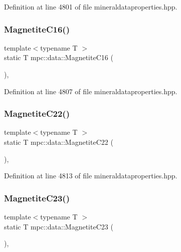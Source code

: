 Definition at line 4801 of file mineraldataproperties.\+hpp.

\mbox{\label{namespacempc_1_1data_aaad0bdfaea022f679ab0cd3856920bb4}} 
\subsubsection{\texorpdfstring{Magnetite\+C16()}{MagnetiteC16()}}
{\footnotesize\ttfamily template$<$typename T $>$ \\
static T mpc\+::data\+::\+Magnetite\+C16 (\begin{DoxyParamCaption}{ }\end{DoxyParamCaption})\hspace{0.3cm}{\ttfamily [inline]}, {\ttfamily [static]}}



Definition at line 4807 of file mineraldataproperties.\+hpp.

\mbox{\label{namespacempc_1_1data_a1c6a2798f409cbc3e05328944425c280}} 
\subsubsection{\texorpdfstring{Magnetite\+C22()}{MagnetiteC22()}}
{\footnotesize\ttfamily template$<$typename T $>$ \\
static T mpc\+::data\+::\+Magnetite\+C22 (\begin{DoxyParamCaption}{ }\end{DoxyParamCaption})\hspace{0.3cm}{\ttfamily [inline]}, {\ttfamily [static]}}



Definition at line 4813 of file mineraldataproperties.\+hpp.

\mbox{\label{namespacempc_1_1data_abd1234216ade8e4dd5469f010ec31bdb}} 
\subsubsection{\texorpdfstring{Magnetite\+C23()}{MagnetiteC23()}}
{\footnotesize\ttfamily template$<$typename T $>$ \\
static T mpc\+::data\+::\+Magnetite\+C23 (\begin{DoxyParamCaption}{ }\end{DoxyParamCaption})\hspace{0.3cm}{\ttfamily [inline]}, {\ttfamily [static]}}



